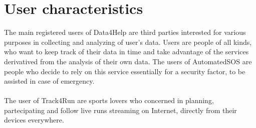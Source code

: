 \section{User characteristics}
The main registered users of Data4Help are third parties interested for various purposes in collecting and analyzing of user's data.
Users are people of all kinds, who want to keep track of their data in time and take advantage of the services derivatived from the analysis of their own data. The users of AutomatedSOS are people who decide to rely on this service essentially for a security factor, to be assisted in case of emergency.
\\ \\The user of Track4Run are sports lovers who concerned in planning, partecipating and follow live runs streaming on Internet, directly from their devices everywhere.
 


